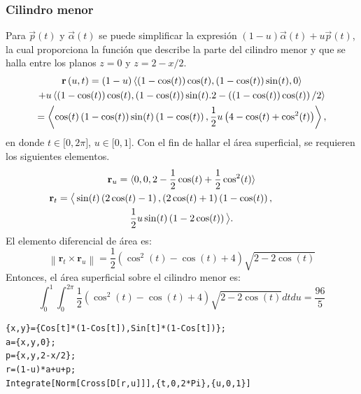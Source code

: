 \subsubsection{Cilindro menor}
Para $\overrightarrow{p}(t)$ y $\overrightarrow{\alpha }(t)$ se puede simplificar la expresión
$(1-u)\overrightarrow{\alpha }(t)+u\overrightarrow{p}(t)$,
la cual proporciona la función que describe la parte del cilindro menor y que se halla entre los planos $z=0$ y $z=2-x/2$.
\begin{multline*}
{\bf r}\left( u,t\right) = \left( 1-u\right) \left\langle \left( 1-\cos (t) \right) \cos
(t) ,\left( 1-\cos (t) \right) \sin (t),0\right\rangle \\
+u\left\langle \left( 1-\cos (t) \right) \cos (t) ,\left( 1-\cos (t) \right) \sin (t).
2-\left( \left( 1-\cos (t) \right) \cos (t) \right)
/2\right\rangle \\
=\left\langle \cos (t) \left( 1-\cos (t) \right)
\sin (t) \left( 1-\cos (t) \right) ,\frac{1}{2}u\left( 4-\cos (t) +\cos ^{2}(t) \right)
\right\rangle,
\end{multline*}
en donde $t\in \lbrack 0,2\pi ]$, $u\in \lbrack 0,1]$.
Con el fin de hallar el área superficial, se requieren los siguientes elementos.
\begin{multline*}
{\bf r}_{u}= \langle 0,0,2-\frac{1}{2}\cos (t) +\frac{1}{2}\cos ^{2}(t) \rangle \\
{\bf r}_{t}= \big\langle \sin (t) \left( 2\cos (t) -1\right) ,\left( 2\cos (t) +1\right) \left( 1-\cos (t) \right) , \hskip1.5cm \\ \frac{1}{2}u\sin (t) \left( 1-2\cos (t) \right) \big\rangle.
\end{multline*}
El elemento diferencial de área es:
\begin{equation}
\left\| \mathbf{r}_{t}\times \mathbf{r}_{u}\right\| = \frac{1}{2}\left( \cos ^{2}(t) -\cos (t) +4\right) \sqrt{2-2\cos (t)}
\end{equation}
Entonces, el área superficial sobre el cilindro menor es:
\begin{equation}
\int_{0}^{1}\int_{0}^{2\pi }\frac{1}{2}\left(\cos ^{2}(t)
-\cos (t) +4\right) \sqrt{2-2\cos (t)}dtdu= \frac{96}{5}
\end{equation}

\begin{tcolorbox}[title=\bf Instrucción en \verb"Mathematica"]\begin{Verbatim}[formatcom=\letraverbatim]
{x,y}={Cos[t]*(1-Cos[t]),Sin[t]*(1-Cos[t])};
a={x,y,0};
p={x,y,2-x/2};
r=(1-u)*a+u+p;
Integrate[Norm[Cross[D[r,u]]],{t,0,2*Pi},{u,0,1}]
\end{Verbatim}
\end{tcolorbox}


